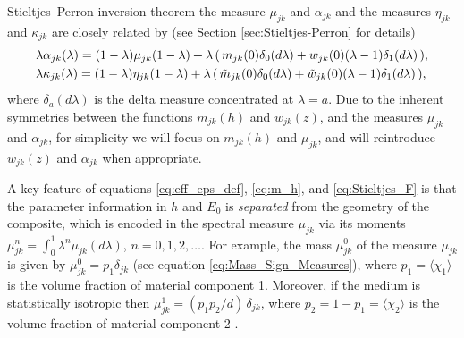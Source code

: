 \documentclass{cmslatex}
\begin{document}
Stieltjes--Perron inversion theorem
\cite{Henrici:1974:v2,MILTON:2002:TC} the measure $\mu_{jk}$ and
$\alpha_{jk}$ and the measures $\eta_{jk}$ and $\kappa_{jk}$ are closely related by
\cite{Murphy:JMP:063506} (see Section \ref{sec:Stieltjes-Perron} for
details)  
%
\begin{align}\label{eq:Measure_Relations}
  &\lambda\alpha_{jk}(\lambda)=(1-\lambda)\mu_{jk}(1-\lambda) +
       \lambda\,(\,m_{jk}(0)\delta_0(d\lambda)+w_{jk}(0)(\lambda-1)\delta_1(d\lambda)\,),
  \\
  &\lambda\kappa_{jk}(\lambda)=(1-\lambda)\eta_{jk}(1-\lambda) +
       \lambda\,(\,\tilde{m}_{jk}(0)\delta_0(d\lambda)+\tilde{w}_{jk}(0)(\lambda-1)\delta_1(d\lambda)\,),
  \notag     
\end{align}
%
where $\delta_a(d\lambda)$ is the delta measure concentrated at $\lambda=a$. Due to the
inherent symmetries between the functions $m_{jk}(h)$ and 
$w_{jk}(z)$, and the measures $\mu_{jk}$ and $\alpha_{jk}$, for simplicity we
will focus on $m_{jk}(h)$ and $\mu_{jk}$, and will reintroduce
$w_{jk}(z)$ and $\alpha_{jk}$ when appropriate. 



A key feature of equations \eqref{eq:eff_eps_def}, \eqref{eq:m_h}, and
\eqref{eq:Stieltjes_F} is that the parameter information in $h$ and
$E_0$ is \emph{separated} from the geometry of the composite, which is
encoded in the spectral measure $\mu_{jk}$ via its moments 
$\mu_{jk}^n=\int_0^1\lambda^n\mu_{jk}(d\lambda)$, $n=0,1,2,\ldots$. For example, the mass
$\mu_{jk}^0$ of the measure $\mu_{jk}$ is given by $\mu_{jk}^0=p_1\delta_{jk}$
(see equation \eqref{eq:Mass_Sign_Measures}), where $p_1=\langle\chi_1\rangle$ is the
volume fraction of material component 1. Moreover, if the medium is 
statistically isotropic then $\mu_{jk}^1=(p_1p_2/d)\,\delta_{jk}$,
where $p_2=1-p_1=\langle\chi_2\rangle$ is the volume fraction of material component 2
\cite{Bruno:JSP-365,Golden:IMA-97}.  
\end{document}
